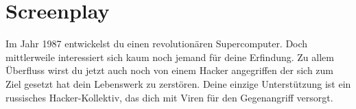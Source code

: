 \chapter{Screenplay}


Im Jahr 1987 entwickelst du einen revolutionären Supercomputer.
Doch mittlerweile interessiert sich kaum noch jemand für deine Erfindung.
Zu allem Überfluss wirst du jetzt auch noch von einem Hacker angegriffen der sich zum Ziel gesetzt hat dein Lebenswerk zu zerstören.
Deine einzige Unterstützung ist ein russisches Hacker-Kollektiv, das dich mit Viren für den Gegenangriff versorgt.


